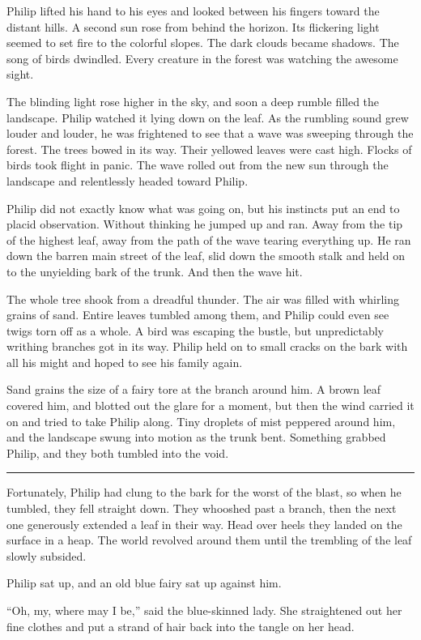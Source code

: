 \documentclass[10pt, draft]{memoir}
\renewcommand{\pfbreakdisplay}{\bigskip \ding{166} \bigskip}
\newcommand{\secbreak}{\fancybreak{\pfbreakdisplay}}
\begin{document}
Philip lifted his hand to his eyes and looked between his fingers toward the
distant hills. A second sun rose from behind the horizon. Its flickering light
seemed to set fire to the colorful slopes. The dark clouds became shadows. The
song of birds dwindled. Every creature in the forest was watching the awesome
sight.

The blinding light rose higher in the sky, and soon a deep rumble filled the
landscape.  Philip watched it lying down on the leaf. As the rumbling sound grew
louder and louder, he was frightened to see that a wave was sweeping through
the forest. The trees bowed in its way. Their yellowed leaves were cast high.
Flocks of birds took flight in panic. The wave rolled out from the new sun
through the landscape and relentlessly headed toward Philip.

Philip did not exactly know what was going on, but his instincts put an end to
placid observation. Without thinking he jumped up and ran. Away from the tip of
the highest leaf, away from the path of the wave tearing everything up.  He ran
down the barren main street of the leaf, slid down the smooth stalk and held on
to the unyielding bark of the trunk. And then the wave hit.

The whole tree shook from a dreadful thunder. The air was filled with whirling
grains of sand. Entire leaves tumbled among them, and Philip could even see
twigs torn off as a whole. A bird was escaping the bustle, but unpredictably
writhing branches got in its way. Philip held on to small cracks on the bark
with all his might and hoped to see his family again.

Sand grains the size of a fairy tore at the branch around him. A brown leaf
covered him, and blotted out the glare for a moment, but then the wind carried
it on and tried to take Philip along. Tiny droplets of mist peppered around
him, and the landscape swung into motion as the trunk bent. Something grabbed
Philip, and they both tumbled into the void.

\secbreak

Fortunately, Philip had clung to the bark for the worst of the blast, so when
he tumbled, they fell straight down. They whooshed past a branch, then the next
one generously extended a leaf in their way. Head over heels they landed on the
surface in a heap. The world revolved around them until the trembling of the
leaf slowly subsided.

Philip sat up, and an old blue fairy sat up against him.

``Oh, my, where may I be,'' said the blue-skinned lady. She straightened out
her fine clothes and put a strand of hair back into the tangle on her head.
\end{document}
